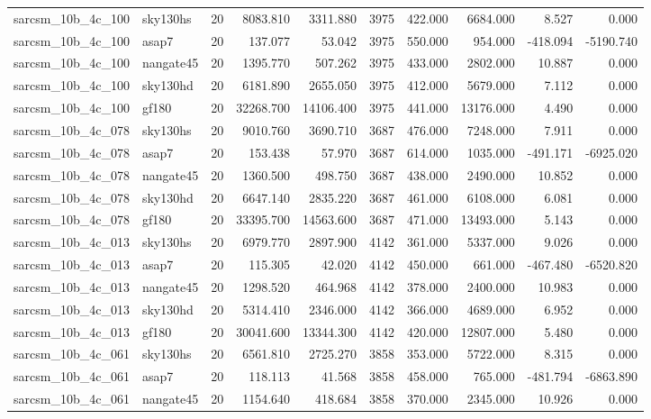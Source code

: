 \begin{tabular}{llrrrrrrrr}
sarcsm\_10b\_4c\_100 & sky130hs & 20 & 8083.810 & 3311.880 & 3975 & 422.000 & 6684.000 & 8.527 & 0.000 \\
sarcsm\_10b\_4c\_100 & asap7 & 20 & 137.077 & 53.042 & 3975 & 550.000 & 954.000 & -418.094 & -5190.740 \\
sarcsm\_10b\_4c\_100 & nangate45 & 20 & 1395.770 & 507.262 & 3975 & 433.000 & 2802.000 & 10.887 & 0.000 \\
sarcsm\_10b\_4c\_100 & sky130hd & 20 & 6181.890 & 2655.050 & 3975 & 412.000 & 5679.000 & 7.112 & 0.000 \\
sarcsm\_10b\_4c\_100 & gf180 & 20 & 32268.700 & 14106.400 & 3975 & 441.000 & 13176.000 & 4.490 & 0.000 \\
sarcsm\_10b\_4c\_078 & sky130hs & 20 & 9010.760 & 3690.710 & 3687 & 476.000 & 7248.000 & 7.911 & 0.000 \\
sarcsm\_10b\_4c\_078 & asap7 & 20 & 153.438 & 57.970 & 3687 & 614.000 & 1035.000 & -491.171 & -6925.020 \\
sarcsm\_10b\_4c\_078 & nangate45 & 20 & 1360.500 & 498.750 & 3687 & 438.000 & 2490.000 & 10.852 & 0.000 \\
sarcsm\_10b\_4c\_078 & sky130hd & 20 & 6647.140 & 2835.220 & 3687 & 461.000 & 6108.000 & 6.081 & 0.000 \\
sarcsm\_10b\_4c\_078 & gf180 & 20 & 33395.700 & 14563.600 & 3687 & 471.000 & 13493.000 & 5.143 & 0.000 \\
sarcsm\_10b\_4c\_013 & sky130hs & 20 & 6979.770 & 2897.900 & 4142 & 361.000 & 5337.000 & 9.026 & 0.000 \\
sarcsm\_10b\_4c\_013 & asap7 & 20 & 115.305 & 42.020 & 4142 & 450.000 & 661.000 & -467.480 & -6520.820 \\
sarcsm\_10b\_4c\_013 & nangate45 & 20 & 1298.520 & 464.968 & 4142 & 378.000 & 2400.000 & 10.983 & 0.000 \\
sarcsm\_10b\_4c\_013 & sky130hd & 20 & 5314.410 & 2346.000 & 4142 & 366.000 & 4689.000 & 6.952 & 0.000 \\
sarcsm\_10b\_4c\_013 & gf180 & 20 & 30041.600 & 13344.300 & 4142 & 420.000 & 12807.000 & 5.480 & 0.000 \\
sarcsm\_10b\_4c\_061 & sky130hs & 20 & 6561.810 & 2725.270 & 3858 & 353.000 & 5722.000 & 8.315 & 0.000 \\
sarcsm\_10b\_4c\_061 & asap7 & 20 & 118.113 & 41.568 & 3858 & 458.000 & 765.000 & -481.794 & -6863.890 \\
sarcsm\_10b\_4c\_061 & nangate45 & 20 & 1154.640 & 418.684 & 3858 & 370.000 & 2345.000 & 10.926 & 0.000 \\

\end{tabular}
